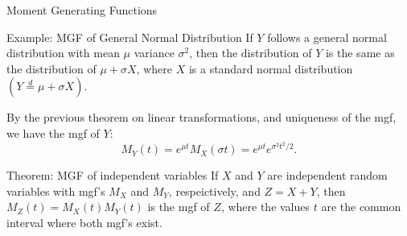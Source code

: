 \begin{frame}[allowframebreaks]{Moment Generating Functions}
  
  \framebreak
  
  \begin{exampleblock}{Example: MGF of General Normal Distribution}
    If $Y$ follows a general normal distribution with mean $\mu$ variance $\sigma^2$, then the distribution of $Y$ is the same as the distribution of $\mu + \sigma X$, where $X$ is a standard normal distribution $(Y \overset{d}{=} \mu + \sigma X)$.
    
    By the previous theorem on linear transformations, and uniqueness of the mgf, we have the mgf of $Y$: 
    $$
    M_Y(t) = e^{\mu t}M_X(\sigma t) = e^{\mu t}e^{\sigma^2 t^2 / 2}. 
    $$
  \end{exampleblock}
  
  \framebreak
  
  \begin{block}{Theorem: MGF of independent variables}
    If $X$ and $Y$ are independent random variables with mgf's $M_X$ and $M_Y$, respeictively, and $Z = X + Y$, then $M_Z(t) = M_X(t)M_Y(t)$ is the mgf of $Z$, where the values $t$ are the common interval where both mgf's exist.
    
    
  \end{block}
  
  
  \framebreak
  

\end{frame}
